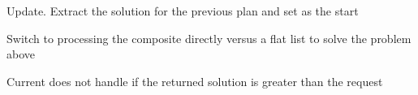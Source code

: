\begin{DoxyRefList}
\label{todo__todo000033}%
%
Update. Extract the solution for the previous plan and set as the start  
\item[Member \mbox{\hyperlink{classtesseract__planning_1_1OMPLMotionPlanner_acbe96b10701a59c016d78ba4aae922eb}{tesseract\+\_\+planning\+::OMPLMotion\+Planner\+::solve}} (const \mbox{\hyperlink{structtesseract__planning_1_1PlannerRequest}{Planner\+Request}} \&request) const override]\label{todo__todo000031}%
%
Switch to processing the composite directly versus a flat list to solve the problem above ~\newline
 

\label{todo__todo000030}%
%
Current does not handle if the returned solution is greater than the request 


\end{DoxyRefList}
